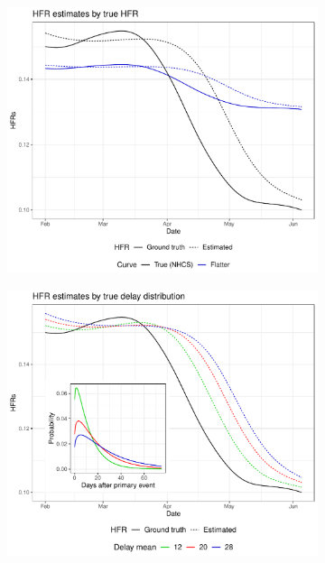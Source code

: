 \documentclass{article}
\begin{document}
\begin{figure}
     \centering
     \begin{subfigure}[b]{0.32\linewidth}
         \centering
         \includegraphics[width=\linewidth]{Figs/Simulated/toy_chging_hfr.pdf}
         \caption{}
         \label{fig:toy_hfr}
     \end{subfigure}
     \begin{subfigure}[b]{0.32\linewidth}
         \centering
         \includegraphics[width=\linewidth]{Figs/Simulated/toy_delay_distr.pdf}

\end{subfigure}
\end{figure}
\end{document}

